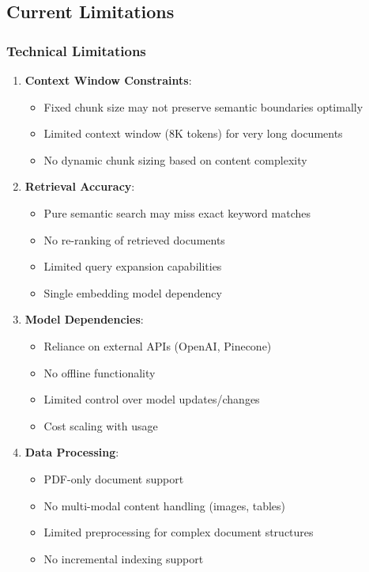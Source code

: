 \documentclass[12pt,a4paper]{article}
\begin{document}
\subsection{Current Limitations}

\subsubsection{Technical Limitations}

\begin{enumerate}
    \item \textbf{Context Window Constraints}:
    \begin{itemize}
        \item Fixed chunk size may not preserve semantic boundaries optimally
        \item Limited context window (8K tokens) for very long documents
        \item No dynamic chunk sizing based on content complexity
    \end{itemize}
    
    \item \textbf{Retrieval Accuracy}:
    \begin{itemize}
        \item Pure semantic search may miss exact keyword matches
        \item No re-ranking of retrieved documents
        \item Limited query expansion capabilities
        \item Single embedding model dependency
    \end{itemize}
    
    \item \textbf{Model Dependencies}:
    \begin{itemize}
        \item Reliance on external APIs (OpenAI, Pinecone)
        \item No offline functionality
        \item Limited control over model updates/changes
        \item Cost scaling with usage
    \end{itemize}
    
    \item \textbf{Data Processing}:
    \begin{itemize}
        \item PDF-only document support
        \item No multi-modal content handling (images, tables)
        \item Limited preprocessing for complex document structures
        \item No incremental indexing support
    \end{itemize}
\end{enumerate}
\end{document}
